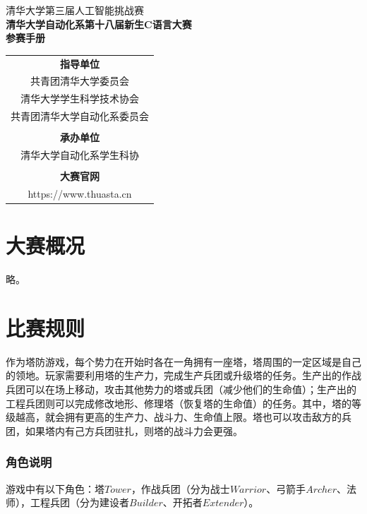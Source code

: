 \documentclass[a4paper,4pt]{article}
\begin{document}
\begin{titlepage}
  \heiti
  \vspace*{20pt}
  \begin{center}
    \fontsize{20pt}{0} {清华大学第三届人工智能挑战赛}\\
    \vspace*{20pt}
    \fontsize{20pt}{0} \textbf{清华大学自动化系第十八届新生C语言大赛}\\
    \vspace*{20pt}
    \fontsize{20pt}{0} \textbf{参赛手册}\\
    \vspace*{280pt}
    \normalsize
    \rmfamily
    \begin{tabular}{c} %
      \textbf{指导单位}            \\
      共青团清华大学委员会         \\
      清华大学学生科学技术协会     \\
      共青团清华大学自动化系委员会 \\
      \\
      \textbf{承办单位}            \\
      清华大学自动化系学生科协     \\
      \\
      \textbf{大赛官网}            \\
      https://www.thuasta.cn       \\
    \end{tabular}
  \end{center}
\end{titlepage}


\tableofcontents%
\newpage%
\part{大赛概况}
略。
\part{比赛规则}

作为塔防游戏，每个势力在开始时各在一角拥有一座塔，塔周围的一定区域是自己的领地。玩家需要利用塔的生产力，完成生产兵团或升级塔的任务。生产出的作战兵团可以在场上移动，攻击其他势力的塔或兵团（减少他们的生命值）；生产出的工程兵团则可以完成修改地形、修理塔（恢复塔的生命值）的任务。其中，塔的等级越高，就会拥有更高的生产力、战斗力、生命值上限。塔也可以攻击敌方的兵团，如果塔内有己方兵团驻扎，则塔的战斗力会更强。

\section{角色说明}
游戏中有以下角色：塔$Tower$，作战兵团（分为战士$Warrior$、弓箭手$Archer$、法师），工程兵团（分为建设者$Builder$、开拓者$Extender$）。
\end{document}
